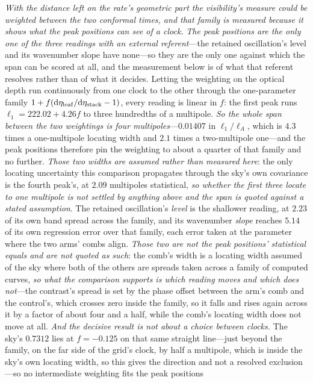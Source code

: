 \documentclass[11pt,a4paper]{article}
\theoremstyle{plain}
\theoremstyle{definition}
\theoremstyle{remark}
\begin{document}
\emph{With the distance left on the rate's geometric part the visibility's measure could be weighted
between the two conformal times, and that family is measured because it shows what the peak positions can see
of a clock.} \emph{The peak positions are the only one of the three
readings with an external referent}---the retained oscillation's level and its wavenumber slope have
none---so they are the only one against which the span can be scored at all, and the measurement below is
of what that referent resolves rather than of what it decides. Letting the weighting on the optical depth run
continuously from one clock to the other through the one-parameter family $1+f(\mathrm{d}\eta_{\rm
leaf}/\mathrm{d}\eta_{\rm stack}-1)$, every reading is linear in $f$: the first peak runs
$\ell_1=222.02+4.26f$ to three hundredths of a multipole. \emph{So the whole span between the two
weightings is four multipoles}---$0.01407$ in $\ell_1/\ell_A$, which is $4.3$ times a
one-multipole locating width and $2.1$ times a two-multipole one---and the peak positions
therefore pin the weighting to about a quarter of that family and no further. \emph{Those two widths are
assumed rather than measured here}: the only locating uncertainty this comparison propagates through the
sky's own covariance is the fourth peak's, at $2.09$ multipoles statistical, \emph{so whether the first three locate to
one multipole is not settled by anything above and the span is quoted against a stated assumption}. The retained oscillation's
\emph{level} is the shallower reading, at $2.23$ of its own band spread across the family, and its wavenumber
\emph{slope} reaches $5.14$ of its own regression error over that family, each error taken at the parameter where
the two arms' combs align. \emph{Those two are not the peak
positions' statistical equals and are not quoted as such}: the comb's width is a locating width assumed of
the sky where both of the others are spreads taken across a family of computed curves, \emph{so what the comparison
supports is which reading moves and which does not}---the contrast's spread is set by the phase offset between the arm's comb and the control's, which crosses zero
inside the family, so it falls and rises again across it by a factor of about four and a half, while the comb's
locating width does not move at all. \emph{And the decisive result is not about a choice between
clocks.} The sky's $0.7312$ lies at $f=-0.125$ on that same straight line---just beyond the family, on the
far side of the grid's clock, by half a multipole, which is inside the sky's own locating
width, so this gives the direction and not a resolved exclusion---so no intermediate weighting fits the peak positions
\end{document}

